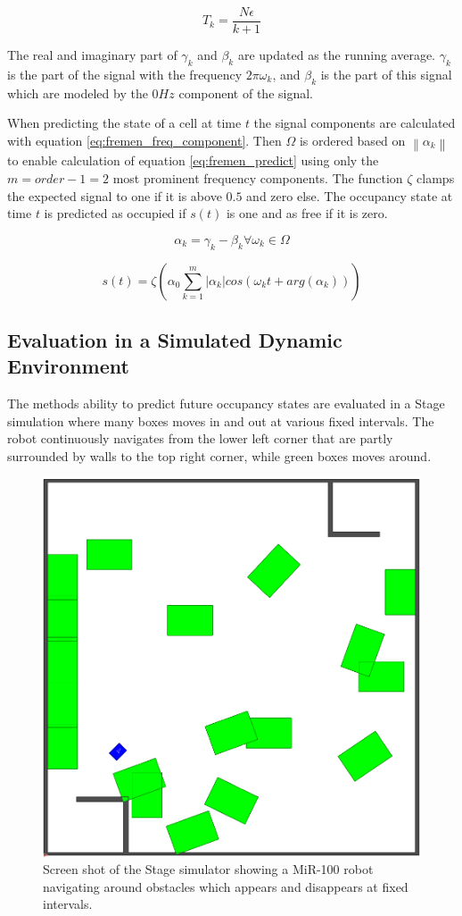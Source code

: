 \begin{equation}
T_k = \frac{N \epsilon}{k+1}
\label{eq:fremen_time}
\end{equation}

The real and imaginary part of $\gamma_k$ and $\beta_k$ are updated as the running average. $\gamma_k$ is the part of the signal with the frequency $2 \pi \omega_k$, and $\beta_k$ is the part of this signal which are modeled by the $0Hz$ component of the signal.

When predicting the state of a cell at time $t$ the signal components are calculated with equation \ref{eq:fremen_freq_component}.
Then $ \Omega $ is ordered based on $ \left\| \alpha_k \right\| $ to enable calculation of equation \ref{eq:fremen_predict} using only the $m=order-1=2$ most prominent frequency components.
The function $\zeta$ clamps the expected signal to one if it is above $0.5$ and zero else.
The occupancy state at time $t$ is predicted as occupied if $s(t)$ is one and as free if it is zero.

\begin{equation}
\alpha_k = \gamma_k - \beta_k \forall \omega_k \in \Omega
\label{eq:fremen_freq_component}
\end{equation}

\begin{equation}
s(t) = \zeta \left( \alpha_0 \sum_{k=1}^{m} |\alpha_k| cos(\omega_k t + arg(\alpha_k))  \right)
\label{eq:fremen_predict}
\end{equation}

\subsection{Evaluation in a Simulated Dynamic Environment}
\label{sec:fremen_sim_eval}
The methods ability to predict future occupancy states are evaluated in a Stage simulation \cite{Vaughan2008} where many boxes moves in and out at various fixed intervals. 
The robot continuously navigates from the lower left corner that are partly surrounded by walls to the top right corner, while green boxes moves around.

\begin{figure}[htbp]
    \centering
    \includegraphics[width=0.4\linewidth]{chapters/mapping_of_dynamic_areas/figures/simulated_environment}
    \caption{Screen shot of the Stage simulator showing a MiR-100 robot navigating around obstacles which appears and disappears at fixed intervals.}
    \label{fig:simulated_environment}
\end{figure}

